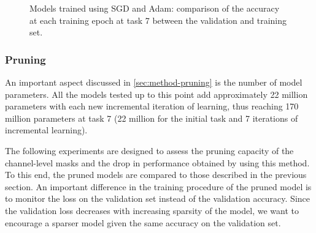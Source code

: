 \begin{figure}[H]
	\centering
    \qquad
	\caption{Models trained using SGD and Adam: comparison of the accuracy at each training epoch at task 7 between the validation and training set.}%
	\label{fig:exp4-train_val}%
\end{figure}

\newpage
\subsubsection{Pruning}
An important aspect discussed in \autoref{sec:method-pruning} is the number of model parameters. All the models tested up to this point add approximately 22 million parameters with each new incremental iteration of learning, thus reaching 170 million parameters at task 7 (22 million for the initial task and 7 iterations of incremental learning).

The following experiments are designed to assess the pruning capacity of the channel-level masks and the drop in performance obtained by using this method. To this end, the pruned models are compared to those described in the previous section. An important difference in the training procedure of the pruned model is to monitor the loss on the validation set instead of the validation accuracy. Since the validation loss decreases with increasing sparsity of the model, we want to encourage a sparser model given the same accuracy on the validation set.

